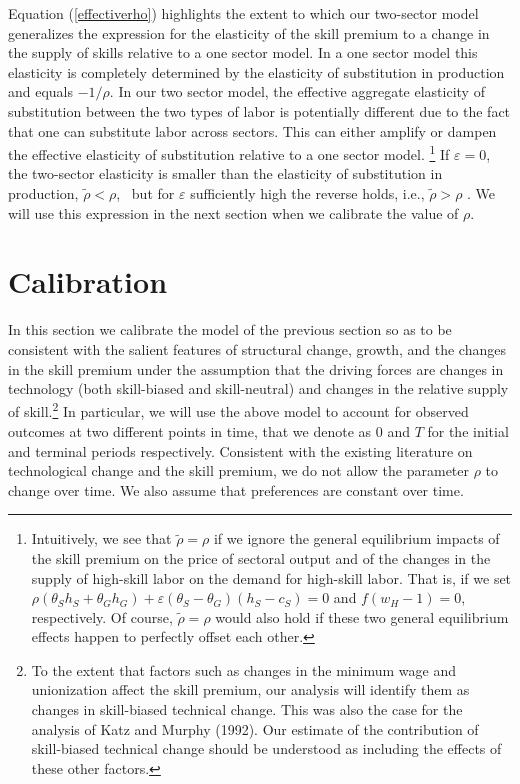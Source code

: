 \documentclass[12pt,english]{article}
\begin{document}
{\normalsize Equation (\ref{effectiverho}) highlights the extent to which
our two-sector model generalizes the expression for the elasticity of the
skill premium to a change in the supply of skills relative to a one sector
model. In a one sector model this elasticity is completely determined by the
elasticity of substitution in production and equals $-1/\rho $. In our two
sector model, the effective aggregate elasticity of substitution between the
two types of labor is potentially different due to the fact that one can
substitute labor across sectors. This can either amplify or dampen the
effective elasticity of substitution relative to a one sector model.%
\footnote{%
Intuitively, we see that $\tilde{\rho}=\rho $ if we ignore the general
equilibrium impacts of the skill premium on the price of sectoral output and
of the changes in the supply of high-skill labor on the demand for
high-skill labor. That is, if we set $\rho (\theta _{S}h_{S}+\theta
_{G}h_{G})+\varepsilon (\theta _{S}-\theta _{G})(h_{S}-c_{S})=0$ and $%
f(w_{H}-1)=0$, respectively. Of course, $\tilde{\rho}=\rho $ would also hold
if these two general equilibrium effects happen to perfectly offset each
other.} If $\varepsilon =0$, the two-sector elasticity is smaller than the
elasticity of substitution in production, $\tilde{\rho}<\rho $, \ but for $%
\varepsilon $ sufficiently high the reverse holds, i.e., $\tilde{\rho}>\rho $%
. We will use this expression in the next section when we calibrate the
value of $\rho $. }

\section{Calibration}

{\normalsize In this section we calibrate the model of the previous section
so as to be consistent with the salient features of structural change,
growth, and the changes in the skill premium under the assumption that the
driving forces are changes in technology (both skill-biased and
skill-neutral) and changes in the relative supply of skill.\footnote{%
To the extent that factors such as changes in the minimum wage and
unionization affect the skill premium, our analysis will identify them as
changes in skill-biased technical change. This was also the case for the
analysis of Katz and Murphy (1992). Our estimate of the contribution of
skill-biased technical change should be understood as including the effects
of these other factors.} In particular, we will use the above model to
account for observed outcomes at two different points in time, that we
denote as $0$ and $T$ for the initial and terminal periods respectively.
Consistent with the existing literature on technological change and the
skill premium, we do not allow the parameter $\rho $ to change over time. We
also assume that preferences are constant over time. }
\end{document}
